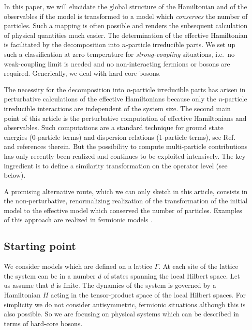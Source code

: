 In this paper, we will elucidate the global structure of
the Hamiltonian and of the observables if the model is transformed
to a model which {\it conserves} the number of particles. Such a mapping
is often possible and renders the subsequent calculation of 
physical quantities much easier. The determination of the effective
Hamiltonian is facilitated by the decomposition into
$n$-particle irreducible parts. We set up such a classification
at zero temperature for {\it strong-coupling} situations, i.e.\
no weak-coupling limit is needed and no non-interacting fermions or
bosons are required. Generically, we deal with hard-core bosons.

The necessity for the decomposition into $n$-particle irreducible parts
has arisen in perturbative calculations of the effective Hamiltonians because
only the $n$-particle irreducible interactions are independent of the system 
size. The second main point of this article is the perturbative 
computation of effective Hamiltonians and observables. 
Such computations are a standard 
technique for ground state energies (0-particle terms) and
 dispersion relations (1-particle terms), see
Ref.~ and references therein. But the possibility 
to compute multi-particle contributions has only recently been realized 
\cite{uhrig98c,knett00b,trebs00} and continues to be exploited
intensively. The key ingredient is to define a similarity transformation
on the operator level (see below).

A promising alternative route, which we can only sketch in this article,
 consists in the non-perturbative, renormalizing realization of the
transformation of the initial model to the effective model
which conserved the number of particles. Examples of this
approach are realized in fermionic models \cite{heidb02a,heidb02b,white02a}.


\subsection{Starting point}
We consider models which are defined on a lattice $\Gamma$. At each site
of the lattice the system can be in a number $d$ of states spanning the local 
Hilbert space. Let us assume that $d$ is finite.
The dynamics of the system is governed
by a Hamiltonian $H$ acting in the tensor-product space of the local
Hilbert spaces. For simplicity we do not consider antisymmetric, fermionic
 situations although this is also possible.
So we are focusing on  physical systems which can be described
in terms of hard-core bosons.

